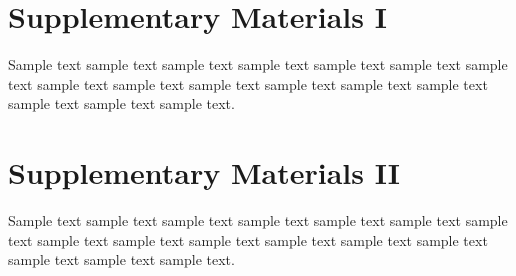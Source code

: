 \documentclass[11pt]{uonthesis}
\begin{document}


\begin{appendices}

\chapter{Supplementary Materials I}

Sample text sample text sample text sample text sample text sample
text sample text sample text sample text sample text sample text
sample text sample text sample text sample text sample text.

\chapter{Supplementary Materials II}

Sample text sample text sample text sample text sample text sample
text sample text sample text sample text sample text sample text
sample text sample text sample text sample text sample text.

\end{appendices}
\end{document}
